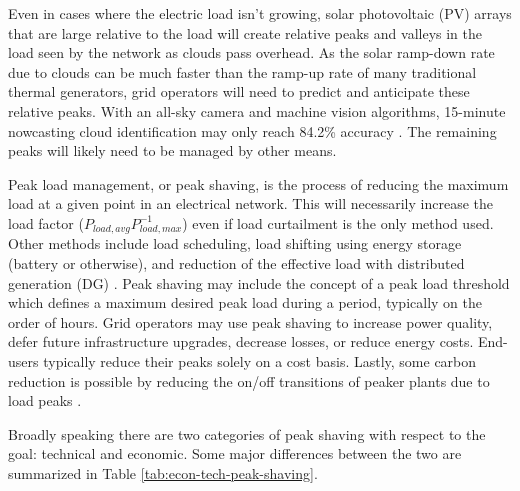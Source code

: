 \documentclass[journal,article,submit,pdftex,moreauthors]{Definitions/mdpi}
\begin{document}
Even in cases where the electric load isn't growing, solar photovoltaic (PV) arrays that are large relative to the load will create relative peaks and valleys in the load seen by the network as clouds pass overhead. As the solar ramp-down rate due to clouds can be much faster than the ramp-up rate of many traditional thermal generators, grid operators will need to predict and anticipate these relative peaks. With an all-sky camera and machine vision algorithms, 15-minute nowcasting cloud identification may only reach 84.2\% accuracy \cite{Nespoli2022}. The remaining peaks will likely need to be managed by other means.


Peak load management, or peak shaving, is the process of reducing the maximum load at a given point in an electrical network. This will necessarily increase the load factor ($P_{load,avg} P_{load,max}^{-1}$) even if load curtailment is the only method used. Other methods include load scheduling, load shifting using energy storage (battery or otherwise), and reduction of the effective load with distributed generation (DG) \cite{Uddin2018}. Peak shaving may include the concept of a peak load threshold which defines a maximum desired peak load during a period, typically on the order of hours. Grid operators may use peak shaving to increase power quality, defer future infrastructure upgrades, decrease losses, or reduce energy costs. End-users typically reduce their peaks solely on a cost basis. Lastly, some carbon reduction is possible by reducing the on/off transitions of peaker plants due to load peaks \cite{Uddin2018}.

Broadly speaking there are two categories of peak shaving with respect to the goal: technical and economic. Some major differences between the two are summarized in Table \ref{tab:econ-tech-peak-shaving}.


\end{document}

